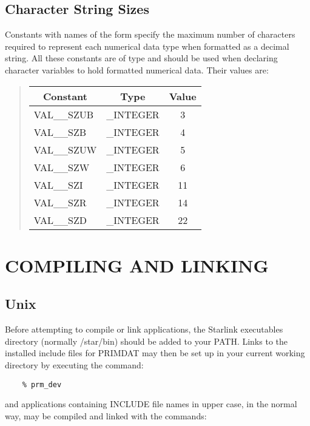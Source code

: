 \subsection{Character String Sizes}

Constants with names of the form  specify the maximum
number of characters required to represent each numerical data type when
formatted as a decimal string. 
All these constants are of type  and should be used when
declaring character variables to hold formatted numerical data. 
Their values are:

\begin{quote}
\begin{center}
\begin{tabular}{|l|l|c|}
\hline
\multicolumn{1}{|c|}{\bf Constant} &
\multicolumn{1}{c|}{\bf Type} &
{\bf Value} \\ 
\hline
VAL\_\_SZUB & \_INTEGER & 3 \\
VAL\_\_SZB & \_INTEGER & 4 \\
VAL\_\_SZUW & \_INTEGER & 5 \\
VAL\_\_SZW & \_INTEGER & 6 \\
VAL\_\_SZI & \_INTEGER & 11 \\
VAL\_\_SZR & \_INTEGER & 14 \\
VAL\_\_SZD & \_INTEGER & 22 \\
\hline
\end{tabular}
\end{center}
\end{quote}

\newpage
\section{COMPILING AND LINKING}

\subsection{Unix}
\label{compunix}
Before attempting to compile or link applications, the Starlink
executables directory (normally /star/bin) should be added to your PATH.
Links to the installed include files for PRIMDAT may then be set up 
in your current working directory by executing the command:

\begin{verbatim}
    % prm_dev
\end{verbatim}

and applications containing INCLUDE file names in upper case, in the normal way,
may be compiled and linked with the commands:


